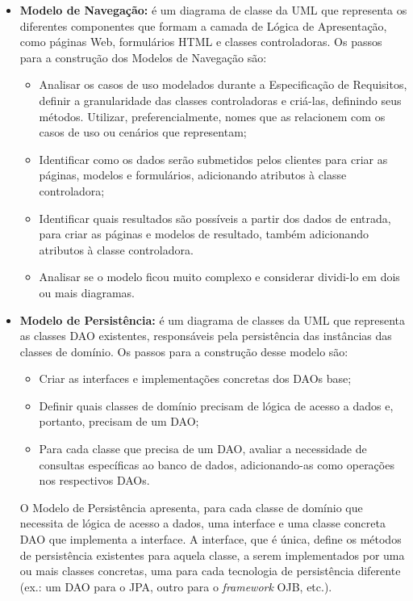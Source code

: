 \begin{itemize}
	\item \textbf{Modelo de Navegação:} é um diagrama de classe da UML que representa os diferentes componentes que formam a camada de Lógica de Apresentação, como páginas Web, formulários HTML e classes controladoras. Os passos para a construção dos Modelos de Navegação são:
	\begin{itemize}
		\item Analisar os casos de uso modelados durante a Especificação de Requisitos, definir a granularidade das classes controladoras e criá-las, definindo seus métodos. Utilizar, preferencialmente, nomes que as relacionem com os casos de uso ou cenários que representam;
		\item Identificar como os dados serão submetidos pelos clientes para criar as páginas, modelos e formulários, adicionando atributos à classe controladora;
		\item Identificar quais resultados são possíveis a partir dos dados de entrada, para criar as páginas e modelos de resultado, também adicionando atributos à classe controladora.
		\item Analisar se o modelo ficou muito complexo e considerar dividi-lo em dois ou mais diagramas.
	\end{itemize}
	
	\item \textbf{Modelo de Persistência:} é um diagrama de classes da UML que representa as classes DAO existentes, responsáveis pela 	persistência das instâncias das classes de domínio. Os passos para a construção desse modelo são:
	\begin{itemize}
		\item Criar as interfaces e implementações concretas dos DAOs base;
		\item Definir quais classes de domínio precisam de lógica de acesso a dados e, portanto, precisam de um DAO;	
		\item Para cada classe que precisa de um DAO, avaliar a necessidade de consultas específicas ao banco de dados, adicionando-as como operações nos respectivos DAOs.
	\end{itemize}
	O Modelo de Persistência apresenta, para cada classe de domínio que necessita de lógica de acesso a dados, uma interface e uma classe concreta DAO que implementa a interface. A interface, que é única, define os métodos de persistência existentes para aquela classe, a serem implementados por uma ou mais classes concretas, uma para cada tecnologia de persistência diferente (ex.: um DAO para o JPA, outro para o \textit{framework} OJB, etc.).
	
\end{itemize}

